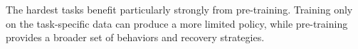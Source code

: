 \begin{dashlist}
The hardest tasks benefit particularly strongly from pre-training. Training only on the task-specific data can produce a more limited policy, while pre-training provides a broader set of behaviors and recovery strategies.
\end{dashlist}



